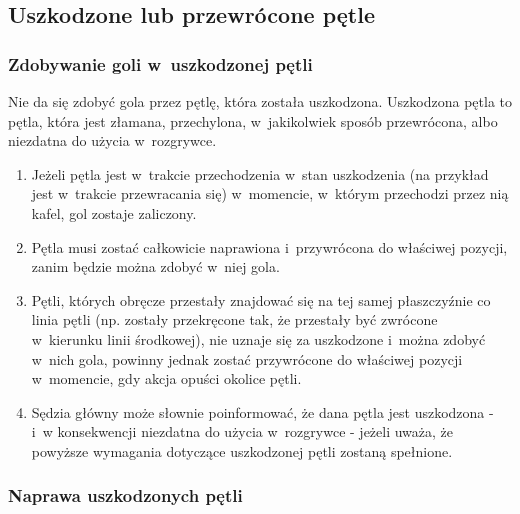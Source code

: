 \documentclass[12pt,a4paper]{article}
\begin{document}
\subsection{Uszkodzone lub przewrócone pętle}

\subsubsection{Zdobywanie goli w~uszkodzonej pętli}
Nie da się zdobyć
gola przez pętlę, która została uszkodzona. Uszkodzona pętla to pętla, która
jest złamana, przechylona, w~jakikolwiek sposób przewrócona, albo
niezdatna do użycia w~rozgrywce.

\begin{enumerate}
	\item
	      Jeżeli pętla jest w~trakcie przechodzenia w~stan uszkodzenia (na przykład jest w~trakcie
	      przewracania się) w~momencie, w~którym przechodzi przez nią kafel, gol
	      zostaje zaliczony.
	\item
	      Pętla musi zostać całkowicie naprawiona i~przywrócona do właściwej
	      pozycji, zanim będzie można zdobyć w~niej gola.
	\item
	      Pętli, których obręcze przestały znajdować się na tej samej
	      płaszczyźnie co linia pętli (np. zostały przekręcone tak, że przestały
	      być zwrócone w~kierunku linii środkowej), nie uznaje się za uszkodzone
	      i~można zdobyć w~nich gola, powinny jednak zostać przywrócone do
	      właściwej pozycji w~momencie, gdy akcja opuści okolice pętli.
	\item
	      Sędzia główny może słownie poinformować, że dana pętla jest
	      uszkodzona - i~w konsekwencji niezdatna do użycia w~rozgrywce - jeżeli
	      uważa, że powyższe wymagania dotyczące uszkodzonej pętli zostaną
	      spełnione.
\end{enumerate}

\subsubsection{Naprawa uszkodzonych pętli}
\end{document}
